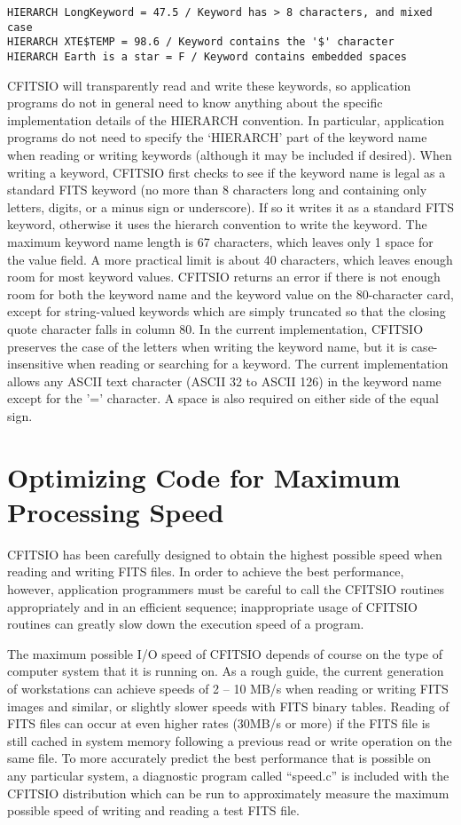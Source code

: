 \documentclass[11pt]{book}
\begin{document}
\begin{verbatim}
HIERARCH LongKeyword = 47.5 / Keyword has > 8 characters, and mixed case
HIERARCH XTE$TEMP = 98.6 / Keyword contains the '$' character
HIERARCH Earth is a star = F / Keyword contains embedded spaces
\end{verbatim}
CFITSIO will transparently read and write these keywords, so application
programs do not in general need to know anything about the specific
implementation details of the HIERARCH convention.  In particular,
application programs do not need to specify the `HIERARCH' part of the
keyword name when reading or writing keywords (although it
may be included if desired).  When writing a keyword, CFITSIO first
checks to see if the keyword name is legal as a standard FITS keyword
(no more than 8 characters long and containing only letters, digits, or
a minus sign or underscore). If so it writes it as a standard FITS
keyword, otherwise it uses the hierarch convention to write the
keyword.   The maximum keyword name length is 67 characters, which
leaves only 1 space for the value field.  A more practical limit is
about 40 characters, which leaves enough room for most keyword values.
CFITSIO returns an error if there is not enough room for both the
keyword name and the keyword value on the 80-character card, except for
string-valued keywords which are simply truncated so that the closing
quote character falls in column 80.  In the current implementation,
CFITSIO preserves the case of the letters when writing the keyword
name, but it is case-insensitive when reading or searching for a
keyword.  The current implementation allows any ASCII text character
(ASCII 32 to ASCII 126) in the keyword name except for the '='
character.  A space is also required on either side of the equal sign.


\section{Optimizing Code for Maximum Processing Speed}

CFITSIO has been carefully designed to obtain the highest possible
speed when reading and writing FITS files.  In order to achieve the
best performance, however, application programmers must be careful to
call the CFITSIO routines appropriately and in an efficient sequence;
inappropriate usage of CFITSIO routines can greatly slow down the
execution speed of a program.

The maximum possible I/O speed of CFITSIO depends of course on the type
of computer system that it is running on.  As a rough guide, the
current generation of workstations can achieve speeds of 2 -- 10 MB/s
when reading or writing FITS images and similar, or slightly slower
speeds with FITS binary tables.  Reading of FITS files can occur at
even higher rates (30MB/s or more) if the FITS file is still cached in
system memory following a previous read or write operation on the same
file.  To more accurately predict the best performance that is possible
on any particular system, a diagnostic program called ``speed.c'' is
included with the CFITSIO distribution which can be run to
approximately measure the maximum possible speed of writing and reading
a test FITS file.
\end{document}

